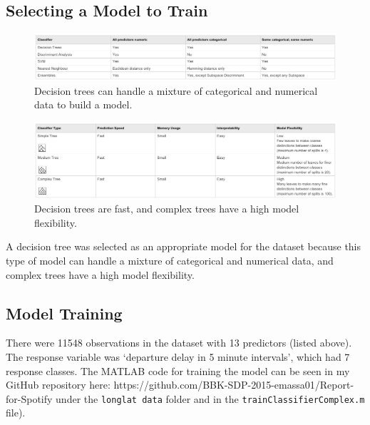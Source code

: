 \documentclass[a4paper, 10pt]{article}
\begin{document}
\vspace{5mm}

\subsection{Selecting a Model to Train}

\begin{figure}[H]
\begin{center}
\includegraphics[scale=0.45]{classifiertypes}
\caption{Decision trees can handle a mixture of categorical and numerical data to build a model.}
\label{classifiertypes}
\end{center}
\end{figure}

\begin{figure}[H]
\begin{center}
\includegraphics[scale=0.45]{decisiontrees}
\caption{Decision trees are fast, and complex trees have a high model flexibility.}
\label{decisiontrees}
\end{center}
\end{figure}

A decision tree was selected as an appropriate model for the dataset because this type of model can handle a mixture of categorical and numerical data, and complex trees have a high model flexibility.

\subsection{Model Training}
There were 11548 observations in the dataset with 13 predictors (listed above). The response variable was `departure delay in 5 minute intervals', which had 7 response classes. The MATLAB code for training the model can be seen in my GitHub repository here: https://github.com/BBK-SDP-2015-emassa01/Report-for-Spotify under the \texttt{longlat data} folder and in the \texttt{trainClassifierComplex.m} file).
\end{document}
